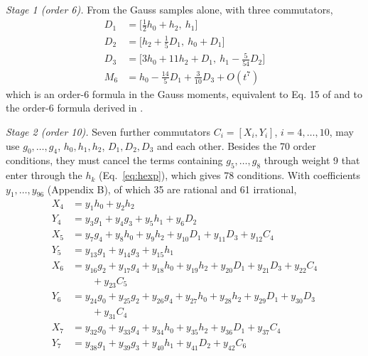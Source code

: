 \documentclass[12pt]{article}
\begin{document}
\emph{Stage 1 (order 6).} From the Gauss samples alone, with three commutators,
\begin{equation}
\begin{aligned}
D_{1}&=\big[\tfrac{1}{2}h_{0}+h_{2},\ h_{1}\big]\\
D_{2}&=\big[h_{2}+\tfrac{1}{5}D_{1},\ h_{0}+D_{1}\big]\\
D_{3}&=\big[3h_{0}+11h_{2}+D_{1},\ h_{1}-\tfrac{5}{54}D_{2}\big]\\
M_{6}&=h_{0}-\tfrac{14}{5}D_{1}+\tfrac{3}{10}D_{3}+O(t^{7})
\end{aligned}\label{eq:stage1}
\end{equation}
which is an order-6 formula in the Gauss moments, equivalent to Eq. 15 of \cite{j28} and to the order-6 formula derived in \cite{jtut}.

\emph{Stage 2 (order 10).} Seven further commutators $C_i=[X_i,Y_i]$, $i=4,\ldots,10$, may use $g_0,\ldots,g_4$, $h_0,h_1,h_2$, $D_1,D_2,D_3$ and each other. Besides the 70 order conditions, they must cancel the terms containing $g_5,\ldots,g_8$ through weight 9 that enter through the $h_k$ (Eq.~\ref{eq:hexp}), which gives 78 conditions. With coefficients $y_1,\ldots,y_{96}$ (Appendix B), of which 35 are rational and 61 irrational,
\begin{equation}
\begin{aligned}
X_{4}&=y_{1}h_{0}+y_{2}h_{2}\\
Y_{4}&=y_{3}g_{1}+y_{4}g_{3}+y_{5}h_{1}+y_{6}D_{2}\\
X_{5}&=y_{7}g_{4}+y_{8}h_{0}+y_{9}h_{2}+y_{10}D_{1}+y_{11}D_{3}+y_{12}C_{4}\\
Y_{5}&=y_{13}g_{1}+y_{14}g_{3}+y_{15}h_{1}\\
X_{6}&=y_{16}g_{2}+y_{17}g_{4}+y_{18}h_{0}+y_{19}h_{2}+y_{20}D_{1}+y_{21}D_{3}+y_{22}C_{4}\\
&\qquad+y_{23}C_{5}\\
Y_{6}&=y_{24}g_{0}+y_{25}g_{2}+y_{26}g_{4}+y_{27}h_{0}+y_{28}h_{2}+y_{29}D_{1}+y_{30}D_{3}\\
&\qquad+y_{31}C_{4}\\
X_{7}&=y_{32}g_{0}+y_{33}g_{4}+y_{34}h_{0}+y_{35}h_{2}+y_{36}D_{1}+y_{37}C_{4}\\
Y_{7}&=y_{38}g_{1}+y_{39}g_{3}+y_{40}h_{1}+y_{41}D_{2}+y_{42}C_{6}
\end{aligned}\label{eq:stage2}
\end{equation}
\end{document}
